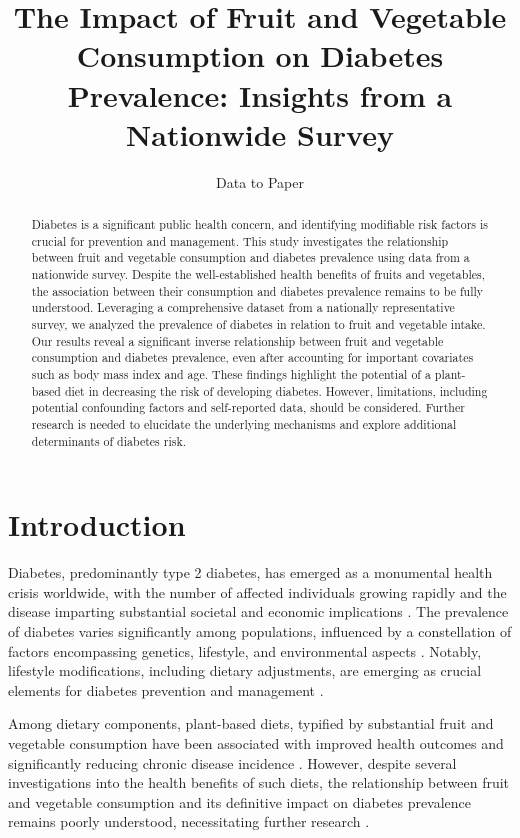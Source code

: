 \documentclass[11pt]{article}
\title{The Impact of Fruit and Vegetable Consumption on Diabetes Prevalence: Insights from a Nationwide Survey}
\author{Data to Paper}
\begin{document}
\maketitle
\begin{abstract}Diabetes is a significant public health concern, and identifying modifiable risk factors is crucial for prevention and management. This study investigates the relationship between fruit and vegetable consumption and diabetes prevalence using data from a nationwide survey. Despite the well-established health benefits of fruits and vegetables, the association between their consumption and diabetes prevalence remains to be fully understood. Leveraging a comprehensive dataset from a nationally representative survey, we analyzed the prevalence of diabetes in relation to fruit and vegetable intake. Our results reveal a significant inverse relationship between fruit and vegetable consumption and diabetes prevalence, even after accounting for important covariates such as body mass index and age. These findings highlight the potential of a plant-based diet in decreasing the risk of developing diabetes. However, limitations, including potential confounding factors and self-reported data, should be considered. Further research is needed to elucidate the underlying mechanisms and explore additional determinants of diabetes risk.\end{abstract}
\section*{Introduction}

Diabetes, predominantly type 2 diabetes, has emerged as a monumental health crisis worldwide, with the number of affected individuals growing rapidly and the disease imparting substantial societal and economic implications \cite{Akter2014PrevalenceOD, Lam2012TheWD, Wu2014RiskFC}. The prevalence of diabetes varies significantly among populations, influenced by a constellation of factors encompassing genetics, lifestyle, and environmental aspects \cite{Chan1994ObesityFD, Wild2006RiskFF}. Notably, lifestyle modifications, including dietary adjustments, are emerging as crucial elements for diabetes prevention and management \cite{Neuenschwander2019RoleOD, Wing2011BenefitsOM,Singh2013TheAQ}.

Among dietary components, plant-based diets, typified by substantial fruit and vegetable consumption have been associated with improved health outcomes and significantly reducing chronic disease incidence \cite{Martnez-Gonzlez2011LowCO,Conklin2016DietaryDD}. However, despite several investigations into the health benefits of such diets, the relationship between fruit and vegetable consumption and its definitive impact on diabetes prevalence remains poorly understood, necessitating further research \cite{Farvid2010DeterminantsOF, Chen2022TheAB}.
\end{document}

